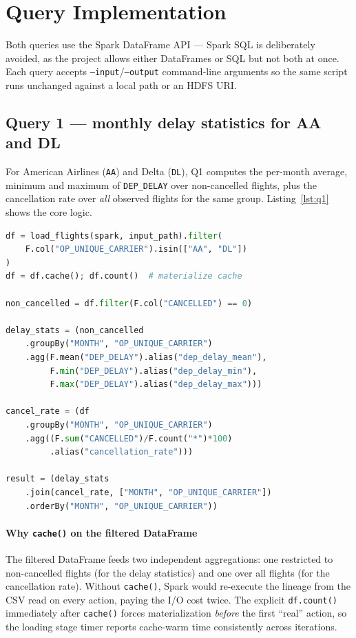\documentclass[conference]{IEEEtran}
\begin{document}
\section{Query Implementation}\label{sec:queries}

Both queries use the Spark DataFrame API --- Spark SQL is
deliberately avoided, as the project allows either DataFrames or
SQL but not both at once. Each query accepts
\texttt{--input}/\texttt{--output} command-line arguments so the
same script runs unchanged against a local path or an HDFS URI.

\subsection{Query 1 --- monthly delay statistics for AA and DL}

For American Airlines (\texttt{AA}) and Delta (\texttt{DL}), Q1
computes the per-month average, minimum and maximum of
\texttt{DEP\_DELAY} over non-cancelled flights, plus the
cancellation rate over \emph{all} observed flights for the same
group. Listing~\ref{lst:q1} shows the core logic.

\begin{lstlisting}[language=Python,
    caption={Core of Query 1.},
    label={lst:q1}]
df = load_flights(spark, input_path).filter(
    F.col("OP_UNIQUE_CARRIER").isin(["AA", "DL"])
)
df = df.cache(); df.count()  # materialize cache

non_cancelled = df.filter(F.col("CANCELLED") == 0)

delay_stats = (non_cancelled
    .groupBy("MONTH", "OP_UNIQUE_CARRIER")
    .agg(F.mean("DEP_DELAY").alias("dep_delay_mean"),
         F.min("DEP_DELAY").alias("dep_delay_min"),
         F.max("DEP_DELAY").alias("dep_delay_max")))

cancel_rate = (df
    .groupBy("MONTH", "OP_UNIQUE_CARRIER")
    .agg((F.sum("CANCELLED")/F.count("*")*100)
         .alias("cancellation_rate")))

result = (delay_stats
    .join(cancel_rate, ["MONTH", "OP_UNIQUE_CARRIER"])
    .orderBy("MONTH", "OP_UNIQUE_CARRIER"))
\end{lstlisting}

\paragraph{Why \texttt{cache()} on the filtered DataFrame}
The filtered DataFrame feeds two independent aggregations: one
restricted to non-cancelled flights (for the delay statistics)
and one over all flights (for the cancellation rate). Without
\texttt{cache()}, Spark would re-execute the lineage from the
CSV read on every action, paying the I/O cost twice. The
explicit \texttt{df.count()} immediately after \texttt{cache()}
forces materialization \emph{before} the first ``real'' action,
so the loading stage timer reports cache-warm time consistently
across iterations.
\end{document}

